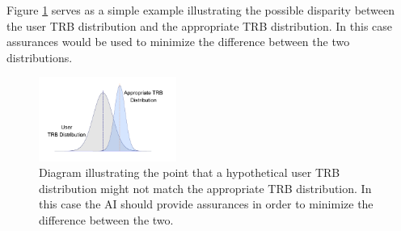     Figure \ref{fig:SimpleTrust_dist} serves as a simple example illustrating the possible disparity between the user TRB distribution and the appropriate TRB distribution. In this case assurances would be used to minimize the difference between the two distributions.

	\begin{figure}[htbp]
    	\centering
     	\includegraphics[width=0.4\textwidth]{Figures/SimpleTrust_dist.png}
    	\caption{Diagram illustrating the point that a hypothetical user TRB distribution might not match the appropriate TRB distribution. In this case the AI should provide assurances in order to minimize the difference between the two.}
        \label{fig:SimpleTrust_dist}
    \end{figure}

